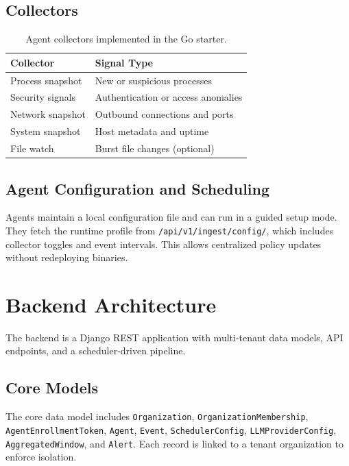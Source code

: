 \documentclass[conference]{IEEEtran}
\begin{document}
\subsection{Collectors}
\begin{table}[!t]
\centering
\begin{tabular}{>{\raggedright\arraybackslash}p{} >{\raggedright\arraybackslash}p{}}
\toprule
\textbf{Collector} & \textbf{Signal Type} \\
\midrule
Process snapshot & New or suspicious processes \\
Security signals & Authentication or access anomalies \\
Network snapshot & Outbound connections and ports \\
System snapshot & Host metadata and uptime \\
File watch & Burst file changes (optional) \\
\bottomrule
\end{tabular}
\caption{Agent collectors implemented in the Go starter.}
\label{tab:collectors}
\end{table}

\subsection{Agent Configuration and Scheduling}
Agents maintain a local configuration file and can run in a guided setup mode. They fetch the runtime profile from \texttt{/api/v1/ingest/config/}, which includes collector toggles and event intervals. This allows centralized policy updates without redeploying binaries.
\FloatBarrier

\section{Backend Architecture}
The backend is a Django REST application with multi-tenant data models, API endpoints, and a scheduler-driven pipeline.

\subsection{Core Models}
The core data model includes \texttt{Organization}, \texttt{OrganizationMembership}, \texttt{AgentEnrollmentToken}, \texttt{Agent}, \texttt{Event}, \texttt{SchedulerConfig}, \texttt{LLMProviderConfig}, \texttt{AggregatedWindow}, and \texttt{Alert}. Each record is linked to a tenant organization to enforce isolation.
\end{document}
